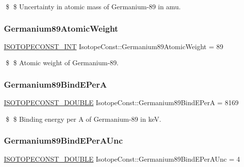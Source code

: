 \$ \$ Uncertainty in atomic mass of Germanium-\/89 in amu. \mbox{\label{group___isotope_const-_germanium-_ge89_ga70008c1452e57db84423e4898e3a6b38}} 
\subsubsection{\texorpdfstring{Germanium89\+Atomic\+Weight}{Germanium89AtomicWeight}}
{\footnotesize\ttfamily \mbox{\hyperlink{group___isotope_const-_macros_ga5f18360b3e99483a35c32d789e62621c}{I\+S\+O\+T\+O\+P\+E\+C\+O\+N\+S\+T\+\_\+\+I\+NT}} Isotope\+Const\+::\+Germanium89\+Atomic\+Weight = 89}

\$ \$ Atomic weight of Germanium-\/89. \mbox{\label{group___isotope_const-_germanium-_ge89_ga29fd93bc123db817b81eac81ed2b48fd}} 
\subsubsection{\texorpdfstring{Germanium89\+Bind\+E\+PerA}{Germanium89BindEPerA}}
{\footnotesize\ttfamily \mbox{\hyperlink{group___isotope_const-_macros_ga8f45a7272ce02c0b4c65c44636ed719a}{I\+S\+O\+T\+O\+P\+E\+C\+O\+N\+S\+T\+\_\+\+D\+O\+U\+B\+LE}} Isotope\+Const\+::\+Germanium89\+Bind\+E\+PerA = 8169}

\$ \$ Binding energy per A of Germanium-\/89 in keV. \mbox{\label{group___isotope_const-_germanium-_ge89_ga22b6d52166c4f8de3d6160079cb90574}} 
\subsubsection{\texorpdfstring{Germanium89\+Bind\+E\+Per\+A\+Unc}{Germanium89BindEPerAUnc}}
{\footnotesize\ttfamily \mbox{\hyperlink{group___isotope_const-_macros_ga8f45a7272ce02c0b4c65c44636ed719a}{I\+S\+O\+T\+O\+P\+E\+C\+O\+N\+S\+T\+\_\+\+D\+O\+U\+B\+LE}} Isotope\+Const\+::\+Germanium89\+Bind\+E\+Per\+A\+Unc = 4}

